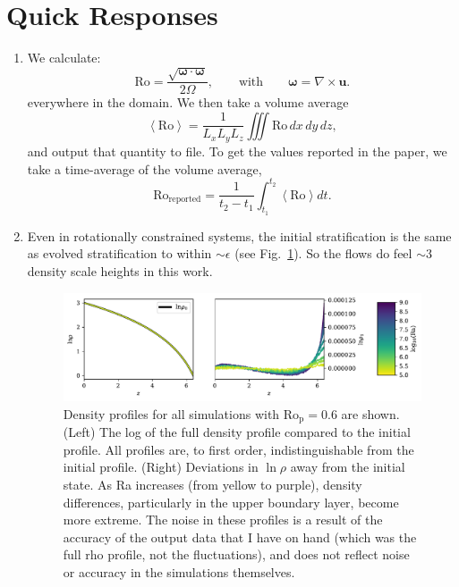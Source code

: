 \documentclass[aps, pre, onecolumn, nofootinbib, notitlepage, groupedaddress, amsfonts, amssymb, amsmath, longbibliography, superscriptaddress]{revtex4-1}
\newcommand{\angles}[1]{\ensuremath{\left\langle #1 \right\rangle}}
\newcommand{\grad}{\ensuremath{\nabla}}
\begin{document}
\section{Quick Responses}

\begin{enumerate}
\item We calculate:
$$
\text{Ro} = \frac{\sqrt{\bm{\omega}\cdot\bm{\omega}}}{2 \Omega},
\qquad\text{with}\qquad
\bm{\omega} = \grad\times\bm{u}.
$$
everywhere in the domain.
We then take a volume average
$$
\angles{\text{Ro}} = \frac{1}{L_x L_y L_z}\iiint \text{Ro}\,dx\,dy\,dz,
$$
and output that quantity to file.
To get the values reported in the paper, we take a time-average of the volume average,
$$
\text{Ro}_{\text{reported}} = \frac{1}{t_2 - t_1}\int_{t_1}^{t_2} \angles{\text{Ro}} dt.
$$
\item Even in rotationally constrained systems, the initial stratification is the same as evolved stratification to within $\sim\epsilon$ (see Fig.~\ref{fig:rot_density}). 
So the flows do feel $\sim$3 density scale heights in this work. 
\begin{figure}[t!]
\includegraphics[width=\textwidth]{./figs/rot_density.pdf}
\caption{ 
	Density profiles for all simulations with Ro$_{\text{p}} = 0.6$ are shown.
	(Left) The log of the full density profile compared to the initial profile.
	All profiles are, to first order, indistinguishable from the initial profile.
	(Right) Deviations in $\ln\rho$ away from the initial state.
	As Ra increases (from yellow to purple), density differences, particularly in the upper boundary layer, become more extreme.
	The noise in these profiles is a result of the accuracy of the output data that I have on hand (which was the full rho profile, not the fluctuations), and does not reflect noise or accuracy in the simulations themselves.
	\label{fig:rot_density} }
\end{figure}


\end{enumerate}
\end{document}
